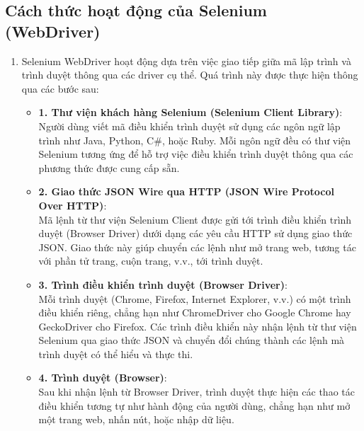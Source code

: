 \subsection{Cách thức hoạt động của Selenium (WebDriver)}
\begin{enumerate}
    \item[] Selenium WebDriver hoạt động dựa trên việc giao tiếp giữa mã lập trình và trình duyệt thông qua các driver cụ thể. Quá trình này được thực hiện thông qua các bước sau:
    \begin{itemize}[left=0.4cm] 
        \item[]\textbf{1. Thư viện khách hàng Selenium (Selenium Client Library)}:\\
        \hspace*{0.3cm}Người dùng viết mã điều khiển trình duyệt sử dụng các ngôn ngữ lập trình như Java, Python, C\#, hoặc Ruby. Mỗi ngôn ngữ đều có thư viện Selenium tương ứng để hỗ trợ việc điều khiển trình duyệt thông qua các phương thức được cung cấp sẵn.
        
        \item[]\textbf{2. Giao thức JSON Wire qua HTTP (JSON Wire Protocol Over HTTP)}:\\
        \hspace*{0.3cm}Mã lệnh từ thư viện Selenium Client được gửi tới trình điều khiển trình duyệt (Browser Driver) dưới dạng các yêu cầu HTTP sử dụng giao thức JSON. Giao thức này giúp chuyển các lệnh như mở trang web, tương tác với phần tử trang, cuộn trang, v.v., tới trình duyệt.
    
        \item[]\textbf{3. Trình điều khiển trình duyệt (Browser Driver)}:\\
        \hspace*{0.3cm}Mỗi trình duyệt (Chrome, Firefox, Internet Explorer, v.v.) có một trình điều khiển riêng, chẳng hạn như ChromeDriver cho Google Chrome hay GeckoDriver cho Firefox. Các trình điều khiển này nhận lệnh từ thư viện Selenium qua giao thức JSON và chuyển đổi chúng thành các lệnh mà trình duyệt có thể hiểu và thực thi.
        \newpage
        
        \item[]\textbf{4. Trình duyệt (Browser)}:\\
        \hspace*{0.3cm}Sau khi nhận lệnh từ Browser Driver, trình duyệt thực hiện các thao tác điều khiển tương tự như hành động của người dùng, chẳng hạn như mở một trang web, nhấn nút, hoặc nhập dữ liệu.


\end{itemize}
\end{enumerate}
